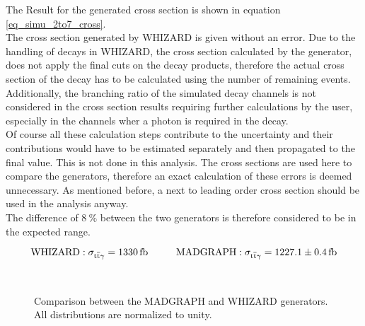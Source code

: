 The Result for the generated cross section is shown in equation \ref{eq_simu_2to7_cross}. \\
The cross section generated by WHIZARD is given without an error. Due to the handling of decays in WHIZARD, the cross section calculated by the generator, does not apply the final cuts on the decay products, therefore the actual cross section of the decay has to be calculated using the number of remaining events. Additionally, the branching ratio of the simulated decay channels is not considered in the cross section results requiring further calculations by the user, especially in the channels wher a photon is required in the decay. \\
Of course all these calculation steps contribute to the uncertainty and their contributions would have to be estimated separately and then propagated to the final value. This is not done in this analysis. The cross sections are used here to compare the generators, therefore an exact calculation of these errors is deemed unnecessary. As mentioned before, a next to leading order cross section should be used in the analysis anyway. \\
The difference of $\SI{8}{\percent}$ between the two generators is therefore considered to be in the expected range.

\begin{equation}
\mathrm{WHIZARD: }\; \sigma_{\ttgamma} = \SI{1330}{\femto \barn} \hspace{1.cm} \mathrm{MADGRAPH: }\; \sigma_{\ttgamma} = \SI{1227.1 \pm 0.4}{\femto \barn}
\label{eq_simu_2to7_cross}
\end{equation}



\begin{figure}
  \\
  \caption{Comparison between the MADGRAPH and WHIZARD generators. All distributions are normalized to unity.}
  \label{fig_simu_comp_2to7_1}
\end{figure}

